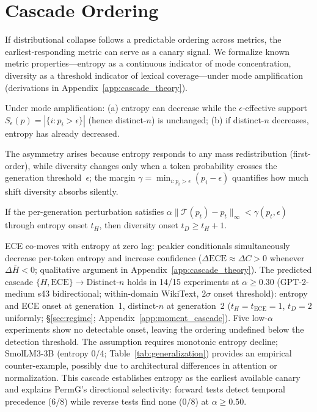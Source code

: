 \section{Cascade Ordering}
\label{sec:cascade}

If distributional collapse follows a predictable ordering across metrics, the earliest-responding metric can serve as a canary signal.
We formalize known metric properties---entropy as a continuous indicator of mode concentration, diversity as a threshold indicator of lexical coverage---under mode amplification~\cite{shumailov2024curse,dohmatob2024tale} (derivations in Appendix~\ref{app:cascade_theory}).

\begin{designprinciple}\label{thm:entropy_leads}
Under mode amplification: \textup{(a)} entropy can decrease while the $\epsilon$-effective support $S_\epsilon(p) {=} |\{i: p_i > \epsilon\}|$ (hence distinct-$n$) is unchanged; \textup{(b)} if distinct-$n$ decreases, entropy has already decreased.
\end{designprinciple}

The asymmetry arises because entropy responds to any mass redistribution (first-order), while diversity changes only when a token probability crosses the generation threshold~$\epsilon$; the margin $\gamma = \min_{i: p_i > \epsilon}(p_i - \epsilon)$ quantifies how much shift diversity absorbs silently.

\begin{designprinciple}\label{prop:div_lag}
If the per-generation perturbation satisfies $\alpha\|\mathcal{T}(p_t) - p_t\|_\infty < \gamma(p_t, \epsilon)$ through entropy onset $t_H$, then diversity onset $t_D \geq t_H + 1$.
\end{designprinciple}

ECE co-moves with entropy at zero lag: peakier conditionals simultaneously decrease per-token entropy and increase confidence ($\Delta\mathrm{ECE} \approx \Delta C > 0$ whenever $\Delta\bar{H} < 0$; qualitative argument in Appendix~\ref{app:cascade_theory}).
The predicted cascade $\{H, \mathrm{ECE}\} \to \mathrm{Distinct}$-$n$ holds in 14/15 experiments at $\alpha \geq 0.30$ (GPT-2-medium s43 bidirectional; within-domain WikiText, $2\sigma$ onset threshold): entropy and ECE onset at generation~1, distinct-$n$ at generation~2 ($t_H{=}t_{\mathrm{ECE}}{=}1$, $t_D{=}2$ uniformly; \S\ref{sec:regime}; Appendix~\ref{app:moment_cascade}).
Five low-$\alpha$ experiments show no detectable onset, leaving the ordering undefined below the detection threshold.
The assumption requires monotonic entropy decline; SmolLM3-3B (entropy 0/4; Table~\ref{tab:generalization}) provides an empirical counter-example, possibly due to architectural differences in attention or normalization.
This cascade establishes entropy as the earliest available canary and explains PermG's directional selectivity: forward tests detect temporal precedence (6/8) while reverse tests find none (0/8) at $\alpha \geq 0.50$.
